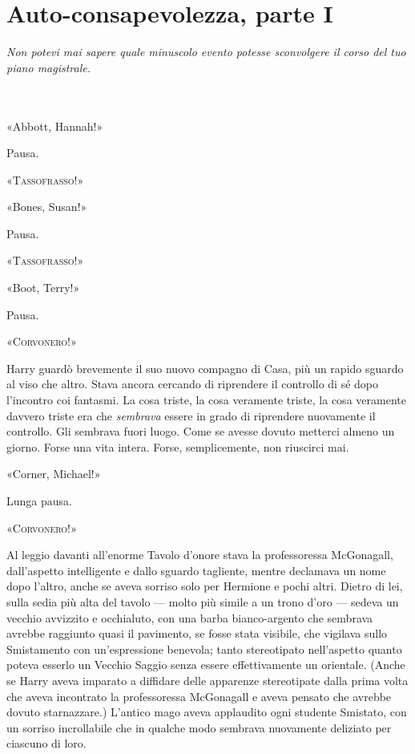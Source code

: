 
\chapter{Auto-consapevolezza, parte I}
\label{capitolo:9}

\emph{Non potevi mai sapere quale minuscolo evento potesse sconvolgere il corso del tuo piano magistrale.}

~\\
~\\


«Abbott, Hannah!»

Pausa.

«\textsc{Tassofrasso!}»

«Bones, Susan!»

Pausa.

«\textsc{Tassofrasso!}»

«Boot, Terry!»

Pausa.

«\textsc{Corvonero!}»

Harry guardò brevemente il suo nuovo compagno di Casa, più un rapido sguardo al viso che altro. Stava ancora cercando di riprendere il controllo di sé dopo l’incontro coi fantasmi. La cosa triste, la cosa veramente triste, la cosa veramente davvero triste era che \textit{sembrava} essere in grado di riprendere nuovamente il controllo. Gli sembrava fuori luogo. Come se avesse dovuto metterci almeno un giorno. Forse una vita intera. Forse, semplicemente, non riuscirci mai.

«Corner, Michael!»

Lunga pausa.

«\textsc{Corvonero!}»

Al leggio davanti all’enorme Tavolo d’onore stava la professoressa McGonagall, dall’aspetto intelligente e dallo sguardo tagliente, mentre declamava un nome dopo l’altro, anche se aveva sorriso solo per Hermione e pochi altri. Dietro di lei, sulla sedia più alta del tavolo — molto più simile a un trono d’oro — sedeva un vecchio avvizzito e occhialuto, con una barba bianco-argento che sembrava avrebbe raggiunto quasi il pavimento, se fosse stata visibile, che vigilava sullo Smistamento con un’espressione benevola; tanto stereotipato nell’aspetto quanto poteva esserlo un Vecchio Saggio senza essere effettivamente un orientale. (Anche se Harry aveva imparato a diffidare delle apparenze stereotipate dalla prima volta che aveva incontrato la professoressa McGonagall e aveva pensato che avrebbe dovuto starnazzare.) L’antico mago aveva applaudito ogni studente Smistato, con un sorriso incrollabile che in qualche modo sembrava nuovamente deliziato per ciascuno di loro.

